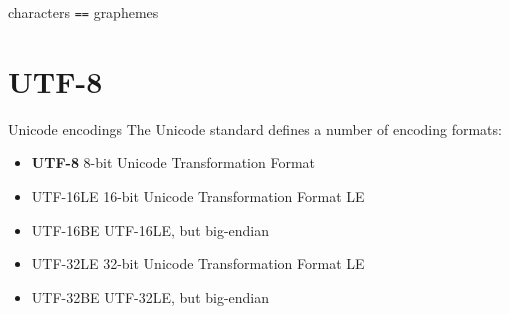 \documentclass[../index.tex]{subfiles}
\begin{document}
\begin{frame}[standout]
  characters \texttt{==} graphemes
\end{frame}

\renewcommand{\sectiontitle}{UTF-8}
\section{\sectiontitle}
%

\renewcommand{\currenttitle}{Unicode encodings}
\begin{frame}{\currenttitle}
%
%
%
%
  The Unicode standard defines a number of encoding formats:

  \begin{itemize}
    \item \textbf{UTF-8} \textendash{} 8-bit Unicode Transformation Format
    \item[] UTF-16LE \textendash{} 16-bit Unicode Transformation Format LE
    \item[] UTF-16BE \textendash{} UTF-16LE, but big-endian
    \item[] UTF-32LE \textendash{} 32-bit Unicode Transformation Format LE
    \item[] UTF-32BE \textendash{} UTF-32LE, but big-endian
  \end{itemize}
\end{frame}
\end{document}
